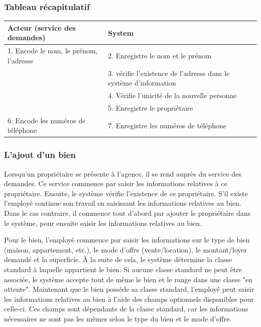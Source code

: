 \subsubsection*{Tableau récapitulatif}
\begin{longtable}{|p{7.5cm}|p{7.5cm}|}
\hline
Acteur (service des demandes) & System\\
\hline
1. Encode le nom, le prénom, l'adresse & 2. Enregistre le nom et le prénom\\
& 3. vérifie l'existence de l'adresse dans le système d'information\\
& 4. Vérifie l'unicité de la nouvelle personne\\
& 5. Enregistre le propriétaire\\
6. Encode les numéros de téléphone  & 7. Enregistre les numéros de téléphone\\
\hline
\end{longtable}
\subsubsection{L'ajout d'un bien}
Lorsqu'un propriétaire se présente à l'agence, il se rend auprès du service des demandes.
Ce service commence par saisir les informations relatives à ce propriétaire.
Ensuite, le système vérifie l'existence de ce propriétaire. S'il existe l'employé continue son travail en saisissant les informations relatives au bien. Dans le cas contraire, il commence tout d'abord par ajouter le propriétaire dans le système, pour ensuite saisir les informations relatives au bien.

Pour le bien, l'employé commence par saisir les informations sur le type de bien (maison, appartement, etc.), le mode d'offre (vente/location), le montant/loyer demandé et la superficie.
À la suite de cela, le système détermine la classe standard à laquelle appartient le bien.
Si aucune classe standard ne peut être associée, le système accepte tout de même le bien et le range dans une classe "en attente".
Maintenant que le bien possède sa classe standard, l'employé peut saisir les informations relatives au bien à l'aide des champs optionnels disponibles pour celle-ci.
Ces champs sont dépendants de la classe standard, car les informations nécessaires ne sont pas les mêmes selon le type du bien et le mode d'offre.

